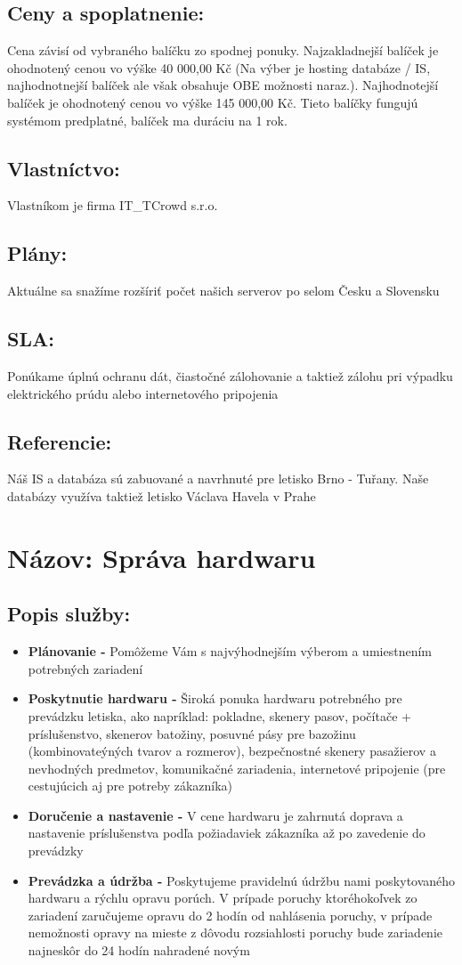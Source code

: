 \documentclass[a4paper, 11pt]{article}
\begin{document}
\subsection*{Ceny a spoplatnenie:}
Cena závisí od vybraného balíčku zo spodnej ponuky. Najzakladnejší balíček je ohodnotený cenou vo výške 40 000,00 Kč (Na výber je hosting databáze / IS, najhodnotnejší balíček ale však obsahuje OBE možnosti naraz.). Najhodnotejší balíček je ohodnotený cenou vo výške 145 000,00 Kč. Tieto balíčky fungujú systémom predplatné, balíček ma duráciu na 1 rok.
\subsection*{Vlastníctvo:}
Vlastníkom je firma IT\_TCrowd s.r.o.
\subsection*{Plány:}
Aktuálne sa snažíme rozšíriť počet našich serverov po selom Česku a Slovensku
\subsection*{SLA:}
Ponúkame úplnú ochranu dát, čiastočné zálohovanie a taktiež zálohu pri výpadku elektrického prúdu alebo internetového pripojenia
\subsection*{Referencie:}
Náš IS a databáza sú zabuované a navrhnuté pre letisko Brno - Tuřany. Naše databázy využíva taktiež letisko Václava Havela v Prahe

\section*{Názov: Správa hardwaru}
\subsection*{Popis služby:}
\begin{itemize}
\item \textbf{Plánovanie - } Pomôžeme Vám s najvýhodnejším výberom a umiestnením potrebných zariadení
\item \textbf{Poskytnutie hardwaru -} Široká ponuka hardwaru potrebného pre prevádzku letiska, ako napríklad: pokladne, skenery pasov, počítače + príslušenstvo, skenerov batožiny, posuvné pásy pre bazožinu (kombinovateýných tvarov a rozmerov), bezpečnostné skenery pasažierov a nevhodných predmetov, komunikačné zariadenia, internetové pripojenie (pre cestujúcich aj pre potreby zákazníka)
\item \textbf{Doručenie a nastavenie -} V cene hardwaru je zahrnutá doprava a nastavenie príslušenstva podľa požiadaviek zákazníka až po zavedenie do prevádzky
\item \textbf{Prevádzka a údržba -} Poskytujeme pravidelnú údržbu nami poskytovaného hardwaru a rýchlu opravu porúch. V prípade poruchy ktoréhokoľvek zo zariadení zaručujeme opravu do 2 hodín od nahlásenia poruchy, v prípade nemožnosti opravy na mieste z dôvodu rozsiahlosti poruchy bude zariadenie najneskôr do 24 hodín nahradené novým
\end{itemize}
\end{document}
